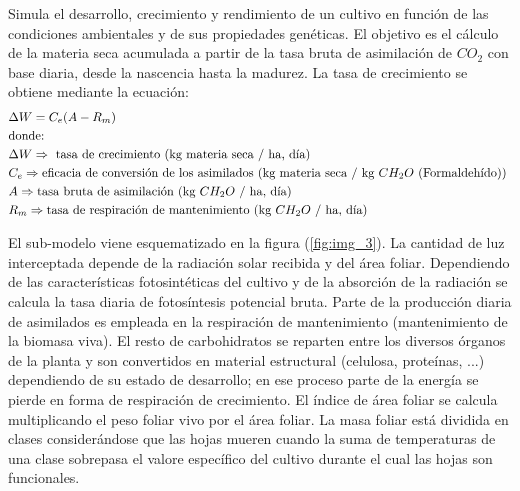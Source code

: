 Simula el desarrollo, crecimiento y rendimiento de un cultivo en función de las condiciones ambientales y de sus propiedades genéticas. El objetivo es el cálculo de la materia seca acumulada a partir de la tasa bruta de asimilación de $ CO_2 $ con base diaria, desde la nascencia hasta la madurez. La tasa de crecimiento se obtiene mediante la ecuación:
\begin{align*}
	&\Delta W = C_e(A-R_m) \\
	&\text{donde: } \\
	&\Delta W \Rightarrow \text{ tasa de crecimiento (kg materia seca / ha, día)} \\
	&C_e  \Rightarrow \text{eficacia de conversión de los asimilados (kg materia seca / kg $ CH_2O $ (Formaldehído)) } \\
	&A \Rightarrow \text{tasa bruta de asimilación (kg $ CH_2O $ / ha, día)} \\
	&R_m \Rightarrow \text{tasa de respiración de mantenimiento  (kg $ CH_2O $ / ha, día)}
\end{align*}

El sub-modelo viene esquematizado en la figura (\ref{fig:img_3}). La cantidad de luz interceptada depende de la radiación solar recibida y del área foliar. Dependiendo de las características fotosintéticas del cultivo y de la absorción de la radiación se calcula la tasa diaria de fotosíntesis potencial bruta. Parte de la producción diaria de asimilados es empleada en la respiración de mantenimiento (mantenimiento de la biomasa viva). El resto de carbohidratos se reparten entre los diversos órganos de la planta y son convertidos en material estructural (celulosa, proteínas, ...) dependiendo de su estado de desarrollo; en ese proceso parte de la energía se pierde en forma de respiración de crecimiento. El índice de área foliar se calcula multiplicando el peso foliar vivo por el área foliar. La masa foliar está dividida en clases considerándose que las hojas mueren cuando la suma de temperaturas de una clase sobrepasa el valore específico del cultivo durante el cual las hojas son funcionales.

